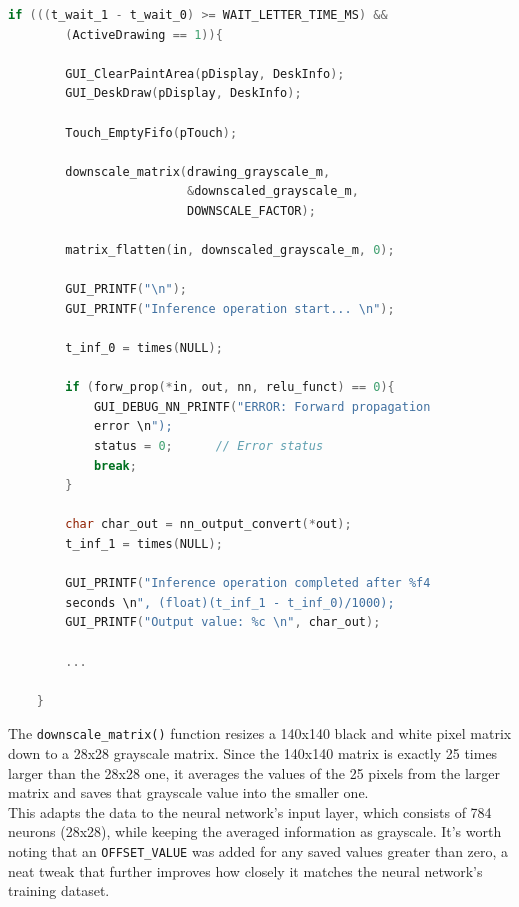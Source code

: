 \newpage

\begin{lstlisting}[language=C, caption={Sending the input to the Neural Network}, label={lst:NN_input_output}]
    if (((t_wait_1 - t_wait_0) >= WAIT_LETTER_TIME_MS) && 
        (ActiveDrawing == 1)){
        
        GUI_ClearPaintArea(pDisplay, DeskInfo);
        GUI_DeskDraw(pDisplay, DeskInfo);
    
        Touch_EmptyFifo(pTouch);
    
        downscale_matrix(drawing_grayscale_m,
                         &downscaled_grayscale_m,
                         DOWNSCALE_FACTOR);
    
        matrix_flatten(in, downscaled_grayscale_m, 0);
    
        GUI_PRINTF("\n");
        GUI_PRINTF("Inference operation start... \n");
    
        t_inf_0 = times(NULL);
    
        if (forw_prop(*in, out, nn, relu_funct) == 0){
            GUI_DEBUG_NN_PRINTF("ERROR: Forward propagation
            error \n");
            status = 0;      // Error status
            break;
        }
    
        char char_out = nn_output_convert(*out);
        t_inf_1 = times(NULL);
    
        GUI_PRINTF("Inference operation completed after %f4
        seconds \n", (float)(t_inf_1 - t_inf_0)/1000);
        GUI_PRINTF("Output value: %c \n", char_out);
        
        ...
        
    }
\end{lstlisting}

\noindent
The \texttt{downscale\_matrix()} function resizes a 140x140 black and white pixel matrix down to a 28x28 grayscale matrix. Since the 140x140 matrix is exactly 25 times larger than the 28x28 one, it averages the values of the 25 pixels from the larger matrix and saves that grayscale value into the smaller one. \\
This adapts the data to the neural network's input layer, which consists of 784 neurons (28x28), while keeping the averaged information as grayscale. It's worth noting that an \texttt{OFFSET\_VALUE} was added for any saved values greater than zero, a neat tweak that further improves how closely it matches the neural network's training dataset.

\newpage

